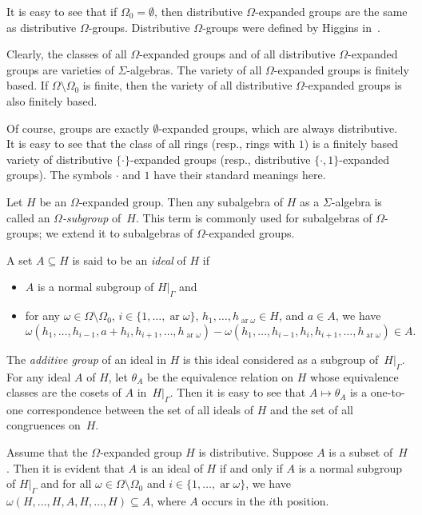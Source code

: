 \documentclass{jgcc}
\DeclareMathOperator{\ar}{ar}
\newcommand{\Add}[1]{#1|_\Gamma}
\begin{document}
It is easy to see that if $\Omega_0=\emptyset$, then
distributive $\Omega$-expanded groups are the same as
distributive $\Omega$-groups. Distributive $\Omega$-groups
were defined by Higgins in~\cite[Section~4]{Hig56}.

Clearly, the classes of all $\Omega$-expanded groups and of
all distributive $\Omega$-expanded groups are varieties of
$\Sigma$-algebras. The variety of all $\Omega$-expanded
groups is finitely based. If $\Omega\setminus\Omega_0$ is
finite, then the variety of all distributive
$\Omega$-expanded groups is also finitely based.

Of course, groups are exactly $\emptyset$-expanded groups,
which are always distributive. It is easy to see that the
class of all rings (resp., rings with $1$) is a finitely
based variety of distributive $\{\cdot\}$-expanded groups
(resp., distributive $\{\cdot,1\}$-expanded groups). The
symbols $\cdot$ and $1$ have their standard meanings here.

Let $H$ be an $\Omega$-expanded group. Then any subalgebra
of $H$ as a $\Sigma$-algebra is called an
\emph{$\Omega$-subgroup} of~$H$. This term is commonly used
for subalgebras of $\Omega$-groups; we extend it to
subalgebras of $\Omega$-expanded groups.

\begin{defi}
A set $A\subseteq H$ is said to be an \emph{ideal} of $H$ if
\begin{itemize}
\item $A$ is a normal subgroup of $\Add H$ and

\item for any $\omega\in\Omega\setminus\Omega_0$,
$i\in\{1,\dots,\ar\omega\}$, $h_1,\dots,h_{\ar\omega}\in H$,
and $a\in A$, we have
\[
\omega(h_1,\dots,h_{i-1},a+h_i,h_{i+1},\dots,h_{\ar\omega})
-\omega(h_1,\dots,h_{i-1},h_i,h_{i+1},\dots,h_{\ar\omega})
\in A.
\]
\end{itemize}
\end{defi}

The \emph{additive group} of an ideal in $H$ is this ideal
considered as a subgroup of~$\Add H$. For any ideal $A$ of
$H$, let $\theta_A$ be the equivalence relation on $H$ whose
equivalence classes are the cosets of $A$ in~$\Add H$. Then
it is easy to see that $A\mapsto\theta_A$ is a one-to-one
correspondence between the set of all ideals of $H$ and the
set of all congruences on~$H$.

\begin{rem}
\label{r:idealsofdisOmegaexpgr}
Assume that the $\Omega$-expanded group $H$ is distributive.
Suppose $A$ is a subset of~$H$. Then it is evident that $A$
is an ideal of $H$ if and only if $A$ is a normal subgroup
of $\Add H$ and for all $\omega\in\Omega\setminus\Omega_0$
and $i\in\{1,\dots,\ar\omega\}$, we have
$\omega(H,\dots,H,A,H,\dots,H)\subseteq A$, where $A$ occurs
in the $i$th position.
\end{rem}
\end{document}
